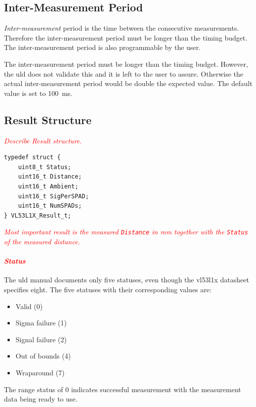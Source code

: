 \documentclass[
  digital,     %
  oneside,     %
  nosansbold,  %
  nocolorbold, %
  lof,         %
  lot,         %
]{fithesis4}
\newcommand{\TODO}[1]{\textcolor{red}{\textit{#1}}}
\begin{document}
{{{\subsection{ Inter-Measurement Period }
\emph{Inter-measurement} period is the time between the consecutive measurements. Therefore the inter-measurement period must be longer than the timing budget. The inter-measurement period is also programmable by the user.

The inter-measurement period must be longer than the timing budget. However, the \acrshort{uld} does not validate this and it is left to the user to assure. Otherwise the actual inter-measurement period would be double the expected value. The default value is set to \qty{100}{\milli\second}.

\subsection{ Result Structure } \label{sec:lidar-result}
\TODO{Describe Result structure.}

\begin{lstlisting}
typedef struct {
    uint8_t Status;
    uint16_t Distance;
    uint16_t Ambient;
    uint16_t SigPerSPAD;
    uint16_t NumSPADs;
} VL53L1X_Result_t;
\end{lstlisting}

\TODO{
Most important result is the measured \lstinline|Distance| in \unit{\milli\metre} together with the \lstinline|Status| of the measured distance.
}

\paragraph{\TODO{Status}}

The \acrshort{uld} manual \cite{um2510} documents only five statuses, even though the \gls{vl53l1x} datasheet \cite{vl53l1x} specifies eight. The five statuses with their corresponding values are:
\begin{itemize}
    \item Valid (0)
    \item Sigma failure (1)
    \item Signal failure (2)
    \item Out of bounds (4)
    \item Wraparound (7)
\end{itemize}

The range status of $0$ indicates successful measurement with the measurement data being ready to use.

}}}
\end{document}
